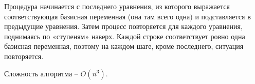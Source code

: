 Процедура начинается с последнего уравнения, из которого выражается соответствующая базисная переменная (она там всего одна) и подставляется в предыдущие уравнения.
Затем процесс повторяется для каждого уравнения, поднимаясь по «ступеням» наверх.
Каждой строке соответствует ровно одна базисная переменная, поэтому на каждом шаге, кроме последнего, ситуация повторяется.

Сложность алгоритма -- $O(n^{3})$.


